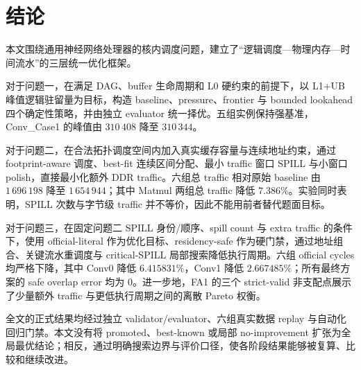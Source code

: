 \section{结论}

本文围绕通用神经网络处理器的核内调度问题，建立了“逻辑调度—物理内存—时间流水”的三层统一优化框架。

对于问题一，在满足 DAG、buffer 生命周期和 L0 硬约束的前提下，以 L1+UB 峰值逻辑驻留量为目标，构造 baseline、pressure、frontier 与 bounded lookahead 四个确定性策略，并由独立 evaluator 统一择优。五组实例保持强基准，Conv\_Case1 的峰值由 $310\,408$ 降至 $310\,344$。

对于问题二，在合法拓扑调度空间内加入真实缓存容量与连续地址约束，通过 footprint-aware 调度、best-fit 连续区间分配、最小 traffic 窗口 SPILL 与小窗口 polish，直接最小化额外 DDR traffic。六组总 traffic 相对原始 baseline 由 $1\,696\,198$ 降至 $1\,654\,944$；其中 Matmul 两组总 traffic 降低 $7.386\%$。实验同时表明，SPILL 次数与字节级 traffic 并不等价，因此不能用前者替代题面目标。

对于问题三，在固定问题二 SPILL 身份/顺序、spill count 与 extra traffic 的条件下，使用 official-literal 作为优化目标、residency-safe 作为硬门禁，通过地址组合、关键流水重调度与 critical-SPILL 局部搜索降低执行周期。六组 official cycles 均严格下降，其中 Conv0 降低 $6.415831\%$，Conv1 降低 $2.667485\%$；所有最终方案的 safe overlap error 均为 0。进一步地，FA1 的三个 strict-valid 非支配点展示了少量额外 traffic 与更低执行周期之间的离散 Pareto 权衡。

全文的正式结果均经过独立 validator/evaluator、六组真实数据 replay 与自动化回归门禁。本文没有将 promoted、best-known 或局部 no-improvement 扩张为全局最优结论；相反，通过明确搜索边界与评价口径，使各阶段结果能够被复算、比较和继续改进。